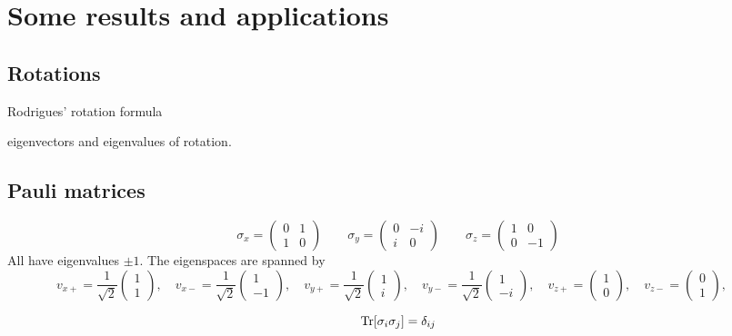 \chapter{Some results and applications}
\section{Rotations}
Rodrigues' rotation formula

eigenvectors and eigenvalues of rotation.
\section{Pauli matrices}

\[ \sigma_x = \begin{pmatrix}
0 & 1 \\ 1 & 0
\end{pmatrix} \qquad \sigma_y = \begin{pmatrix}
0 & -i \\ i & 0
\end{pmatrix} \qquad \sigma_z = \begin{pmatrix}
1 & 0 \\ 0 & -1
\end{pmatrix} \]
All have eigenvalues $\pm 1$. The eigenspaces are spanned by
\[ v_{x+} = \frac{1}{\sqrt{2}}\begin{pmatrix}
1 \\ 1
\end{pmatrix}, \quad v_{x-} = \frac{1}{\sqrt{2}}\begin{pmatrix}
1 \\ -1
\end{pmatrix}, \quad v_{y+} = \frac{1}{\sqrt{2}}\begin{pmatrix}
1 \\ i
\end{pmatrix}, \quad v_{y-} = \frac{1}{\sqrt{2}}\begin{pmatrix}
1 \\ -i
\end{pmatrix}, \quad v_{z+} = \begin{pmatrix}
1 \\ 0
\end{pmatrix}, \quad v_{z-} = \begin{pmatrix}
0 \\ 1
\end{pmatrix}, \quad  \]

\[ \operatorname{Tr}[\sigma_i \sigma_j] = \delta_{ij} \]

